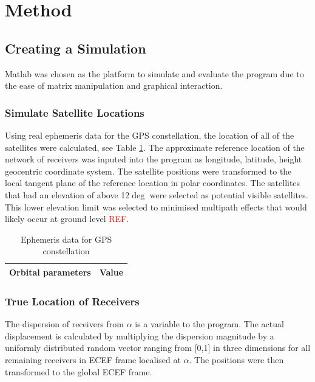 

\section{Method}\label{sec:Method}

\subsection{Creating a Simulation}
Matlab was chosen as the platform to simulate and evaluate the program due to the ease of matrix manipulation and graphical interaction.
\subsubsection{Simulate Satellite Locations}
Using real ephemeris data for the GPS constellation, the location of all of the satellites were calculated, see Table \ref{Table: eph gps data}. The approximate reference location of the network of receivers was inputed into the program as longitude, latitude, height geocentric coordinate system. The satellite positions were transformed to the local tangent plane of the reference location in polar coordinates. The satellites that had an elevation of above 12$\deg$ were selected as potential visible satellites. This lower elevation limit was selected to minimised multipath effects that would likely occur at ground level \textcolor{red}{REF}. 
\begin{table}
\centering
\caption{Ephemeris data for GPS constellation}
\label{Table: eph gps data}
\begin{tabular}{|c|c|}
\hline
Orbital parameters & Value \\\hline
\end{tabular}
\end{table}





\subsubsection{True Location of Receivers}
The dispersion of receivers from $\alpha$ is a variable to the program. The actual displacement is calculated by multiplying the dispersion magnitude by a uniformly distributed random vector ranging from [0,1] in three dimensions for all remaining receivers in ECEF frame localised at $\alpha$. The positions were then transformed to the global ECEF frame.

